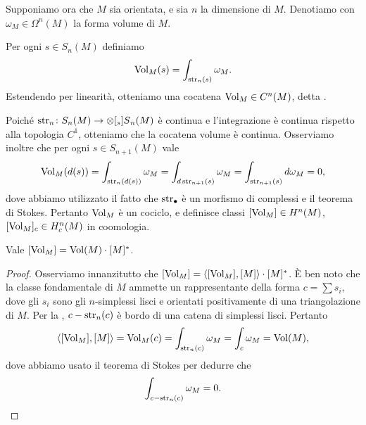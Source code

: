 Supponiamo ora che $M$ sia orientata, e sia $n$ la dimensione di $M$. Denotiamo con $\omega_M\in\Omega^n(M)$ la forma volume di $M$.
\begin{definition}
Per ogni $s\in S_n(M)$ definiamo
\[
\operatorname{Vol}_M(s)=\int_{\operatorname{str}_n(s)}\omega_M.
\]
Estendendo per linearità, otteniamo una cocatena $\operatorname{Vol}_M\in C^n(M)$, detta .
\end{definition}
Poiché $\map{\str_n}{S_n(M)}{\prepost[_s]{S}{_n}(M)}$ è continua e l'integrazione è continua rispetto alla topologia $C^1$, otteniamo che la cocatena volume è continua. Osserviamo inoltre che per ogni $s\in S_{n+1}(M)$ vale
\[
\operatorname{Vol}_M(d(s))=\int_{\operatorname{str}_n(d(s))}\omega_M=\int_{d\operatorname{str}_{n+1}(s)}\omega_M=\int_{\operatorname{str}_{n+1}(s)}d\omega_M=0,
\]
dove abbiamo utilizzato il fatto che $\operatorname{str}_\bullet$ è un morfismo di complessi e il teorema di Stokes. Pertanto $\operatorname{Vol}_M$ è un cociclo, e definisce classi $[\operatorname{Vol}_M]\in H^n(M)$, $[\operatorname{Vol}_M]_c\in H^n_c(M)$ in coomologia.

\begin{lemma}
Vale $[\operatorname{Vol}_M]=\operatorname{Vol}(M)\cdot[M]^*$.
\end{lemma}
\begin{proof}
Osserviamo innanzitutto che $[\operatorname{Vol}_M]=\langle[\operatorname{Vol}_M],[M]\rangle\cdot[M]^*$. È ben noto che la classe fondamentale di $M$ ammette un rappresentante della forma $c=\sum s_i$, dove gli $s_i$ sono gli $n$-simplessi lisci e orientati positivamente di una triangolazione di $M$. Per la , $c-\operatorname{str}_n(c)$ è bordo di una catena di simplessi lisci. Pertanto
\[
\langle[\operatorname{Vol}_M],[M]\rangle=\operatorname{Vol}_M(c)=\int_{\operatorname{str}_n(c)}\omega_M=\int_{c}\omega_M=\operatorname{Vol}(M),
\]
dove abbiamo usato il teorema di Stokes per dedurre che
\[
\int_{c-\operatorname{str}_n(c)}\omega_M=0.\qedhere
\]
\end{proof}